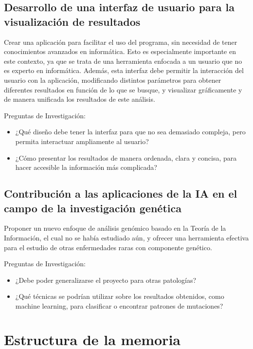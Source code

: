 \documentclass[11pt,spanish,listoffigures,listoftables]{tfgetsinf}
\begin{document}
\subsection{Desarrollo de una interfaz de usuario para la visualización de resultados }

Crear una aplicación para facilitar el uso del programa, sin necesidad de tener conocimientos avanzados en informática. Esto es especialmente importante en este contexto, ya que se trata de una herramienta enfocada a un usuario que no es experto en informática. Además, esta interfaz debe permitir la interacción del usuario con la aplicación, modificando distintos parámetros para obtener diferentes resultados en función de lo que se busque, y visualizar gráficamente y de manera unificada los resultados de este análisis. 

Preguntas de Investigación: 
\begin{itemize}
\item ¿Qué diseño debe tener la interfaz para que no sea demasiado compleja, pero permita interactuar ampliamente al usuario? 
\item ¿Cómo presentar los resultados de manera ordenada, clara y concisa, para hacer accesible la información más complicada? 
\end{itemize}

\subsection{Contribución a las aplicaciones de la IA en el campo de la investigación genética }

Proponer un nuevo enfoque de análisis genómico basado en la Teoría de la Información, el cual no se había estudiado aún, y ofrecer una herramienta efectiva para el estudio de otras enfermedades raras con componente genético. 

Preguntas de Investigación: 
\begin{itemize}
\item ¿Debe poder generalizarse el proyecto para otras patologías? 
\item ¿Qué técnicas se podrían utilizar sobre los resultados obtenidos, como machine learning, para clasificar o encontrar patrones de mutaciones? 
\end{itemize}


\section{Estructura de la memoria}
\end{document}
